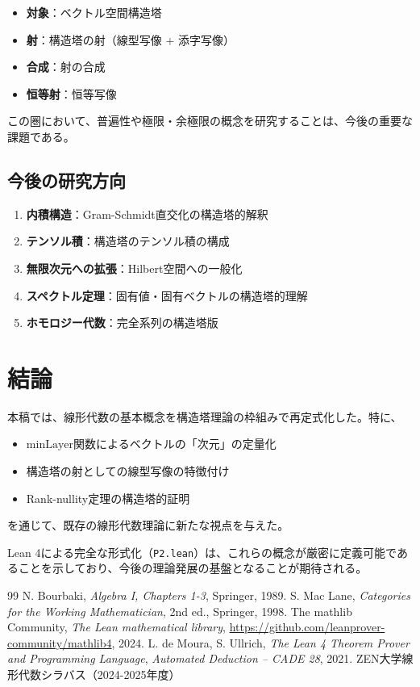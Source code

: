 \documentclass[a4paper,11pt]{ltjsarticle}
\theoremstyle{definition}
\begin{document}
\begin{itemize}
  \item \textbf{対象}：ベクトル空間構造塔
  \item \textbf{射}：構造塔の射（線型写像 + 添字写像）
  \item \textbf{合成}：射の合成
  \item \textbf{恒等射}：恒等写像
\end{itemize}

この圏において、普遍性や極限・余極限の概念を研究することは、今後の重要な課題である。

\subsection{今後の研究方向}

\begin{enumerate}
  \item \textbf{内積構造}：Gram-Schmidt直交化の構造塔的解釈
  \item \textbf{テンソル積}：構造塔のテンソル積の構成
  \item \textbf{無限次元への拡張}：Hilbert空間への一般化
  \item \textbf{スペクトル定理}：固有値・固有ベクトルの構造塔的理解
  \item \textbf{ホモロジー代数}：完全系列の構造塔版
\end{enumerate}

\section{結論}

本稿では、線形代数の基本概念を構造塔理論の枠組みで再定式化した。特に、
\begin{itemize}
  \item $\mathrm{minLayer}$関数によるベクトルの「次元」の定量化
  \item 構造塔の射としての線型写像の特徴付け
  \item Rank-nullity定理の構造塔的証明
\end{itemize}
を通じて、既存の線形代数理論に新たな視点を与えた。

Lean 4による完全な形式化（\texttt{P2.lean}）は、これらの概念が厳密に定義可能であることを示しており、今後の理論発展の基盤となることが期待される。

\begin{thebibliography}{99}
 N. Bourbaki, \textit{Algebra I, Chapters 1-3}, Springer, 1989.
 S. Mac Lane, \textit{Categories for the Working Mathematician}, 2nd ed., Springer, 1998.
 The mathlib Community, \textit{The Lean mathematical library}, \url{https://github.com/leanprover-community/mathlib4}, 2024.
 L. de Moura, S. Ullrich, \textit{The Lean 4 Theorem Prover and Programming Language}, \textit{Automated Deduction – CADE 28}, 2021.
 ZEN大学線形代数シラバス（2024-2025年度）
\end{thebibliography}
\end{document}
